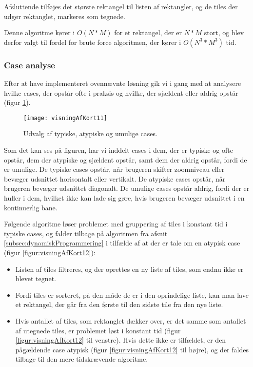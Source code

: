 Afsluttende tilføjes det største rektangel til listen af rektangler, og de tiles der udgør rektanglet, markeres som tegnede.

Denne algoritme kører i $O(N * M)$ for et rektangel, der er $N * M$ stort, og blev derfor valgt til fordel for brute force algoritmen, der kører i $O(N^3 * M^3)$ tid.

\subsubsection{Case analyse}
\label{subsec:caseAnalyse}

Efter at have implementeret ovennævnte løsning gik vi i gang med at analysere hvilke cases, der opstår ofte i praksis og hvilke, der sjældent eller aldrig opstår (figur \ref{figur:visningAfKort11}).

\begin{figure}[h]
	\centering
	\texttt{[image: visningAfKort11]}
	\captionsetup{width=0.8\textwidth}
	\caption{Udvalg af typiske, atypiske og umulige cases.}
	\label{figur:visningAfKort11}
\end{figure}

Som det kan ses på figuren, har vi inddelt cases i dem, der er typiske og ofte opstår, dem der atypiske og sjældent opstår, samt dem der aldrig opstår, fordi de er umulige. De typiske cases opstår, når brugeren skifter zoomniveau eller bevæger udsnittet horisontalt eller vertikalt. De atypiske cases opstår, når brugeren bevæger udsnittet diagonalt. De umulige cases opstår aldrig, fordi der er huller i dem, hvilket ikke kan lade sig gøre, hvis brugeren bevæger udsnittet i en kontinuerlig bane.

Følgende algoritme løser problemet med gruppering af tiles i konstant tid i typiske cases, og falder tilbage på algoritmen fra afsnit \ref{subsec:dynamiskProgrammering} i tilfælde af at der er tale om en atypisk case (figur \ref{figur:visningAfKort12}):

\begin{itemize}
	\item Listen af tiles filtreres, og der oprettes en ny liste af tiles, som endnu ikke er blevet tegnet.
	\item Fordi tiles er sorteret, på den måde de er i den oprindelige liste, kan man lave et rektangel, der går fra den første til den sidste tile fra den nye liste.
	\item Hvis antallet af tiles, som rektanglet dækker over, er det samme som antallet af utegnede tiles, er problemet løst i konstant tid (figur \ref{figur:visningAfKort12} til venstre). Hvis dette ikke er tilfældet, er den pågældende case atypisk (figur \ref{figur:visningAfKort12} til højre), og der faldes tilbage til den mere tidskrævende algoritme.
\end{itemize}

